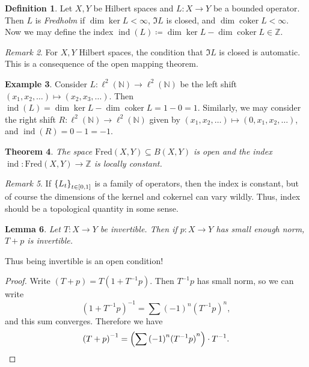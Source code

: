 \documentclass[leqno, openany]{memoir}
\newtheorem{thm}{Theorem}[section]
\newtheorem{lem}[thm]{Lemma}
\theoremstyle{definition}
\newtheorem{defn}[thm]{Definition}
\newtheorem{exm}[thm]{Example}
\theoremstyle{remark}
\newtheorem{rmk}[thm]{Remark}
\theoremstyle{plain}
\theoremstyle{definition}
\theoremstyle{remark}
\newcommand{\N}{\mathbb{N}}
\newcommand{\Z}{\mathbb{Z}}
\newcommand{\mr}[1]{\mathrm{#1}}
\DeclareMathOperator{\coker}{coker}
\DeclareMathOperator{\ind}{ind}
\begin{document}
\begin{defn} Let $X, Y$ be Hilbert spaces and $L \colon X \to Y$ be a bounded
    operator. Then $L$ is \textit{Fredholm} if $\dim \ker L < \infty$, $\Im L$
    is closed, and $\dim \coker L < \infty$. Now we may define the index
    $\ind(L) \coloneqq \dim \ker L - \dim \coker L \in \Z$.  \end{defn}

\begin{rmk} For $X,Y$ Hilbert spaces, the condition that $\Im L$ is closed is
automatic. This is a consequence of the open mapping theorem.  \end{rmk}

\begin{exm} Consider $L \colon \ell^2(\N) \to \ell^2(\N)$ be the left shift
    $(x_1, x_2, \ldots) \mapsto (x_2, x_3, \ldots)$. Then $\ind(L) = \dim \ker
    L - \dim \coker L = 1 - 0 = 1$. Similarly, we may consider the right shift
    $R \colon \ell^2(\N) \to \ell^2(\N)$ given by $(x_1, x_2,\ldots) \mapsto
    (0,x_1,x_2,\ldots)$, and $\ind(R) = 0-1=-1$.  \end{exm}

\begin{thm} The space $\mr{Fred}(X,Y) \subseteq B(X,Y)$ is open and the index
$\ind \colon \mr{Fred}(X,Y) \to \Z$ is locally constant.  \end{thm}

\begin{rmk} If $\qty{L_t}_{t \in [0,1]}$ is a family of operators, then the
index is constant, but of course the dimensions of the kernel and cokernel can
vary wildly. Thus, index should be a topological quantity in some sense.
\end{rmk}

\begin{lem} Let $T \colon X \to Y$ be invertible. Then if $p \colon X \to Y$
has small enough norm, $T + p$ is invertible.  \end{lem}

Thus being invertible is an open condition!

\begin{proof} Write $(T + p) = T(1 + T^{-1}p)$. Then $T^{-1}p$ has small norm,
    so we can write \[ {(1+T^{-1}p)}^{-1} = \sum {(-1)}^n {(T^{-1} p)}^n, \]
    and this sum converges. Therefore we have \[ {(T+p)}^{-1} = \qty(\sum
    {(-1)}^n {(T^{-1}p)}^n) \cdot T^{-1}. \qedhere \] \end{proof}
\end{document}
